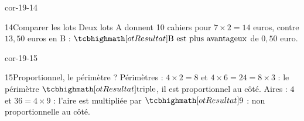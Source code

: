 \begin{blocLivre}{cor-19-14}\begin{corrige}{14}{Comparer les lots}
Deux lots A donnent 10 cahiers pour $7\times2=14$ euros, contre $13{,}50$ euros en B : $\res{\text{B est plus avantageux}}$ de $0{,}50$ euro.
\end{corrige}\end{blocLivre}
\begin{blocLivre}{cor-19-15}\begin{corrige}{15}{Proportionnel, le périmètre ?}
Périmètres : $4\times2=8$ et $4\times6=24=8\times3$ : le périmètre $\res{\text{triple}}$, il est proportionnel au côté. Aires : $4$ et $36=4\times9$ : l’aire est multipliée par $\res9$ : non proportionnelle au côté.
\end{corrige}\end{blocLivre}
